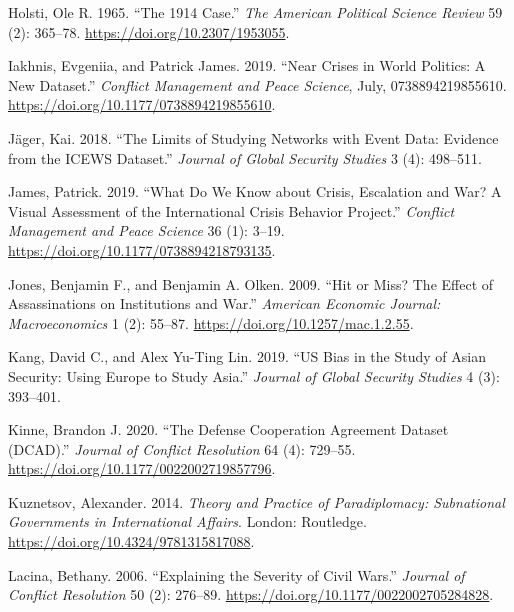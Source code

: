 \documentclass{article}
\newlength{\cslhangindent}
\newlength{\cslentryspacingunit} %
\newenvironment{CSLReferences}[2] %
 {%
  \setlength{\parindent}{0pt}
  \ifodd #1
  \let\oldpar\par
  \def\par{\hangindent=\cslhangindent\oldpar}
  \fi
  \setlength{\parskip}{#2\cslentryspacingunit}
 }%
 {}
\begin{document}
\begin{CSLReferences}{1}{0}
\leavevmode{}%
Holsti, Ole R. 1965. {``The 1914 {Case}.''} \emph{The American Political
Science Review} 59 (2): 365--78. \url{https://doi.org/10.2307/1953055}.

\leavevmode{}%
Iakhnis, Evgeniia, and Patrick James. 2019. {``Near Crises in World
Politics: {A} New Dataset.''} \emph{Conflict Management and Peace
Science}, July, 0738894219855610.
\url{https://doi.org/10.1177/0738894219855610}.

\leavevmode{}%
Jäger, Kai. 2018. {``The {Limits} of {Studying Networks} with {Event
Data}: {Evidence} from the {ICEWS Dataset}.''} \emph{Journal of Global
Security Studies} 3 (4): 498--511.

\leavevmode{}%
James, Patrick. 2019. {``What Do We Know about Crisis, Escalation and
War? {A} Visual Assessment of the {International Crisis Behavior
Project}.''} \emph{Conflict Management and Peace Science} 36 (1): 3--19.
\url{https://doi.org/10.1177/0738894218793135}.

\leavevmode{}%
Jones, Benjamin F., and Benjamin A. Olken. 2009. {``Hit or {Miss}? {The
Effect} of {Assassinations} on {Institutions} and {War}.''}
\emph{American Economic Journal: Macroeconomics} 1 (2): 55--87.
\url{https://doi.org/10.1257/mac.1.2.55}.

\leavevmode{}%
Kang, David C., and Alex Yu-Ting Lin. 2019. {``{US} Bias in the Study of
{Asian} Security: {Using Europe} to Study {Asia}.''} \emph{Journal of
Global Security Studies} 4 (3): 393--401.

\leavevmode{}%
Kinne, Brandon J. 2020. {``The {Defense Cooperation Agreement Dataset}
({DCAD}).''} \emph{Journal of Conflict Resolution} 64 (4): 729--55.
\url{https://doi.org/10.1177/0022002719857796}.

\leavevmode{}%
Kuznetsov, Alexander. 2014. \emph{Theory and {Practice} of
{Paradiplomacy}: {Subnational Governments} in {International Affairs}}.
{London}: {Routledge}. \url{https://doi.org/10.4324/9781315817088}.

\leavevmode{}%
Lacina, Bethany. 2006. {``Explaining the {Severity} of {Civil Wars}.''}
\emph{Journal of Conflict Resolution} 50 (2): 276--89.
\url{https://doi.org/10.1177/0022002705284828}.


\end{CSLReferences}
\end{document}
